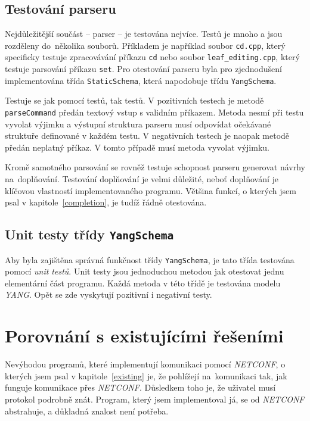 \documentclass[thesis=B,czech,hidelinks]{FITthesis}[2019/03/06]
\begin{document}
\subsection{Testování parseru}
Nejdůležitější součást -- parser -- je testována nejvíce. Testů je mnoho a jsou rozděleny do~několika souborů. Příkladem je například soubor \texttt{cd.cpp}, který specificky testuje zpracovávání příkazu \texttt{cd} nebo soubor \texttt{leaf\_editing.cpp}, který testuje parsování příkazu \texttt{set}. Pro otestování parseru byla pro zjednodušení implementována třída \texttt{StaticSchema}, která napodobuje třídu \texttt{YangSchema}.

Testuje se jak pomocí  testů, tak  testů. V pozitivních testech je metodě \texttt{parseCommand} předán textový vstup s validním příkazem. Metoda nesmí při testu vyvolat výjimku a výstupní struktura parseru musí odpovídat očekávané struktuře definované v každém testu. V negativních testech je naopak metodě předán neplatný příkaz. V tomto případě musí metoda vyvolat výjimku.

Kromě samotného parsování se rovněž testuje schopnost parseru generovat návrhy na~doplňování. Testování doplňování je velmi důležité, neboť doplňování je klíčovou vlastností implementovaného programu. Většina funkcí, o kterých jsem psal v kapitole~\ref{completion}, je tudíž řádně otestována.

\subsection{Unit testy třídy \texttt{YangSchema}}
Aby byla zajištěna správná funkčnost třídy \texttt{YangSchema}, je tato třída testována pomocí \textit{unit testů}. Unit testy jsou jednoduchou metodou jak otestovat jednu elementární část programu. Každá metoda v této třídě je testována modelu \textit{YANG}. Opět se zde vyskytují pozitivní i negativní testy.


\section{Porovnání s existujícími řešeními}
Nevýhodou programů, které implementují komunikaci pomocí \textit{NETCONF}, o kterých jsem psal v kapitole~\ref{existing} je, že pohlížejí na~komunikaci tak, jak funguje komunikace přes \textit{NETCONF}. Důsledkem toho je, že uživatel musí protokol podrobně znát. Program, který jsem implementoval já, se od \textit{NETCONF} abstrahuje, a důkladná znalost není potřeba.
\end{document}
